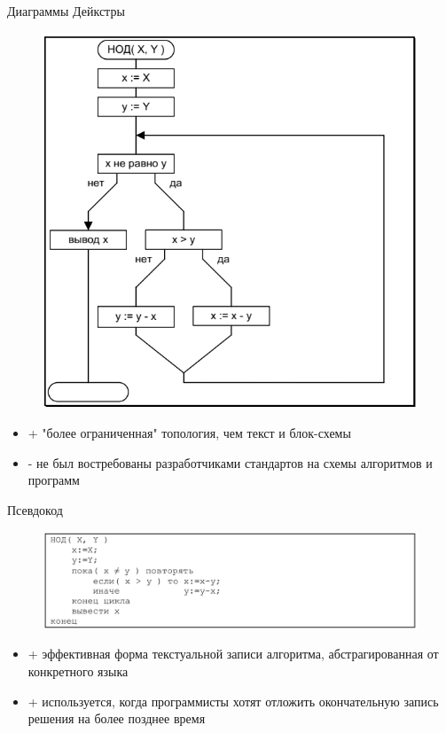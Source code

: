 \documentclass{beamer}
\begin{document}
\begin{frame}
\begin{block}{Диаграммы Дейкстры}
\begin{figure}[h]
\centering
\includegraphics[scale=0.35]{images/lec01-pic04.png}
\end{figure}
\end{block}
\begin{itemize}
\item + "более ограниченная" топология, чем текст и блок-схемы
\item - не был востребованы разработчиками стандартов на схемы алгоритмов и программ
\end{itemize}
\end{frame}

\begin{frame}
\begin{block}{Псевдокод}
\begin{figure}[h]
\centering
\includegraphics[scale=0.35]{images/lec01-pic05.png}
\end{figure}
\end{block}
\begin{itemize}
\item + эффективная форма текстуальной записи алгоритма, абстрагированная от конкретного языка
\item + используется, когда программисты хотят отложить окончательную запись решения на более позднее время
\end{itemize}
\end{frame}
\end{document}
